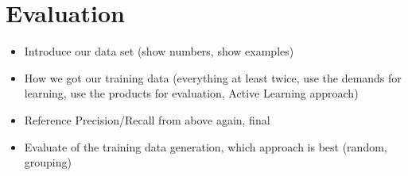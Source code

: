 
\section{Evaluation}
\label{sec:evaluation}

\begin{itemize}
	\item Introduce our data set (show numbers, show examples)
	\item How we got our training data (everything at least twice, use the demands for learning, use the products for evaluation, Active Learning approach)
	\item Reference Precision/Recall from above again, final 
	\item Evaluate of the training data generation, which approach is best (random, grouping)
\end{itemize}


